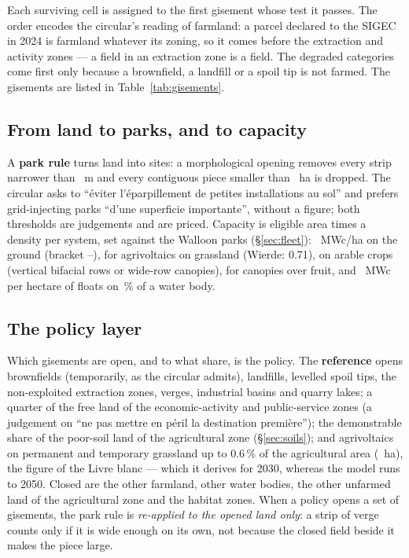 \documentclass[11pt,a4paper]{article}
\begin{document}
Each surviving cell is assigned to the first gisement whose test it passes. The
order encodes the circular's reading of farmland: a parcel declared to the SIGEC
in 2024 is farmland whatever its zoning, so it comes before the extraction and
activity zones --- a field in an extraction zone is a field. The degraded
categories come first only because a brownfield, a landfill or a spoil tip is not
farmed. The gisements are listed in Table~\ref{tab:gisements}.

\subsection{From land to parks, and to capacity}

A \textbf{park rule} turns land into sites: a morphological opening removes
every strip narrower than \ParkMinWidth{}~m and every contiguous piece smaller
than \ParkMinHa{}~ha is dropped. The circular asks to ``éviter l'éparpillement
de petites installations au sol'' and prefers grid-injecting parks ``d'une
superficie importante'', without a figure; both thresholds are judgements and
are priced. Capacity is eligible area times a density per system, set against
the Walloon parks (\S{}\ref{sec:fleet}): \DensGround{}~MWc/ha on the ground
(bracket \DensGroundLow{}--\DensGroundHigh{}), \DensAgrivoltaicGrazing{} for
agrivoltaics on grassland (Wierde: 0.71), \DensAgrivoltaicCrops{} on arable
crops (vertical bifacial rows or wide-row canopies), \DensAgrivoltaicCanopy{}
for canopies over fruit, and \DensFloating{}~MWc per hectare of floats on
\FloatCover{}\,\% of a water body.

\subsection{The policy layer}\label{sec:policy}

Which gisements are open, and to what share, is the policy. The
\textbf{reference} opens brownfields (temporarily, as the circular admits),
landfills, levelled spoil tips, the non-exploited extraction zones, verges,
industrial basins and quarry lakes; a quarter of the free land of the
economic-activity and public-service zones (a judgement on ``ne pas mettre en
péril la destination première''); the demonstrable share of the poor-soil land
of the agricultural zone (\S{}\ref{sec:soils}); and agrivoltaics on permanent and
temporary grassland up to 0.6\,\% of the agricultural area (\RefCapHa{}~ha),
the figure of the Livre blanc --- which it derives for 2030, whereas the model
runs to 2050. Closed are the other farmland, other water bodies, the other
unfarmed land of the agricultural zone and the habitat zones. When
a policy opens a set of gisements, the park rule is \emph{re-applied to the
opened land only}: a strip of verge counts only if it is wide enough on its own,
not because the closed field beside it makes the piece large.
\end{document}
